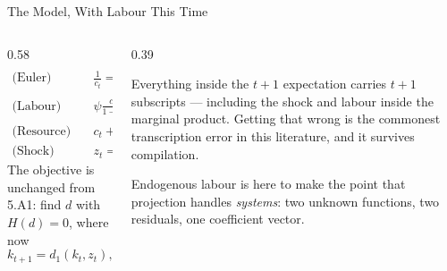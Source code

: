 \begin{frame}{The Model, With Labour This Time}
\begin{columns}[T]
\begin{column}{0.58\textwidth}
\small
\vspace{-2mm}
\begin{align*}
\text{(Euler)}\quad & \frac{1}{c_{t}}=\beta\mathbb{E}_{t}\!\left[\frac{1}{c_{t+1}}\Big(1+\alpha k_{t+1}^{\alpha-1}(e^{z_{t+1}}l_{t+1})^{1-\alpha}-\delta\Big)\right]\\
\text{(Labour)}\quad & \psi\frac{c_{t}}{1-l_{t}}=(1-\alpha)k_{t}^{\alpha}(e^{z_{t}}l_{t})^{1-\alpha}\frac{1}{l_{t}}\\
\text{(Resource)}\quad & c_{t}+k_{t+1}=k_{t}^{\alpha}(e^{z_{t}}l_{t})^{1-\alpha}+(1-\delta)k_{t}\\
\text{(Shock)}\quad & z_{t}=\rho z_{t-1}+\varepsilon_{t}
\end{align*}
The objective is unchanged from 5.A1: find $d$ with $H(d)=0$, where now
\[
  k_{t+1}=d_1(k_t,z_t),\qquad l_t=d_2(k_t,z_t).
\]
\end{column}
\begin{column}{0.39\textwidth}
\begin{cautionbox}[title=\textbf{Read the indices}]\footnotesize
Everything inside the $t+1$ expectation carries $t+1$ subscripts --- including the shock and labour inside the marginal product. Getting that wrong is the commonest transcription error in this literature, and it survives compilation.
\end{cautionbox}
\medskip
\begin{examplebox}\footnotesize
Endogenous labour is here to make the point that projection handles \emph{systems}: two unknown functions, two residuals, one coefficient vector.
\end{examplebox}
\end{column}
\end{columns}
\vspace{1mm}
\end{frame}

